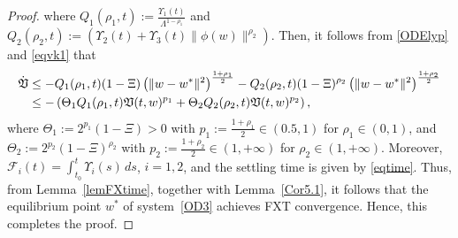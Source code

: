 \documentclass{article}
\theoremstyle{plain}%
\theoremstyle{thmstyletwo}%
\theoremstyle{thmstylethree}%
\begin{document}
\begin{proof}
where $Q_1(\rho_1,t) := \frac{\Upsilon_1(t)}{\Lambda^{1-\rho_1}}$ and $Q_2(\rho_2, t):= (\Upsilon_2(t) + \Upsilon_3(t) \|\phi(w)\|^{\rho_2})$. Then, it follows from \eqref{ODElyp} and \eqref{eqvk1} that
\begin{align}
\notag\dot{\mathfrak{V}} &\leq -Q_1(\rho_1,t) (1- \Xi)\left( \|w - w^*\|^2 \right)^{\frac{1+\rho_1}{2}} - Q_2(\rho_2, t)(1- \Xi)^{\rho_2}\left( \|w - w^*\|^2 \right)^{\frac{1+\rho_2}{2}} \\
&\leq -\left( \Theta_1 Q_1(\rho_1,t)\mathfrak{V}(t,w)^{p_1} + \Theta_2 Q_2(\rho_2,t)  \mathfrak{V}(t,w)^{p_2} \right),
\end{align}
where $\Theta_1 := 2^{p_1}(1-\Xi)>0$ with $p_1 := \frac{1+\rho_1}{2}\in(0.5,1)$ for $\rho_1\in(0,1)$, and 
$\Theta_2 := 2^{p_2}(1-\Xi)^{\rho_2}$ with $p_2 := \frac{1+\rho_2}{2}\in(1,+\infty)$ for $\rho_2\in(1,+\infty)$.
Moreover, $\mathcal{F}_i(t)=\int_{t_0}^t \Upsilon_i(s)\,ds$, $i=1,2$, and the settling time is given by \eqref{eqtime}. Thus, from Lemma~\eqref{lemFXtime}, together with Lemma~\eqref{Cor5.1}, it follows that the equilibrium point $w^*$ of system~\eqref{OD3} achieves FXT convergence.  Hence, this completes the proof.
\end{proof}
\end{document}
